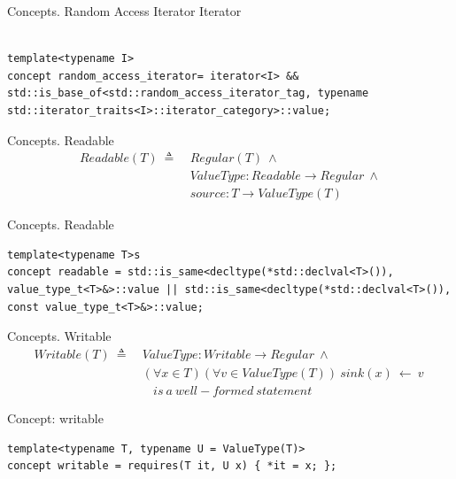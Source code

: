 \documentclass[10pt]{beamer}
\begin{document}
\begin{frame}[fragile]{Concepts. Random Access Iterator Iterator}
\begin{lstlisting}[style=cpp]

template<typename I>
concept random_access_iterator= iterator<I> && std::is_base_of<std::random_access_iterator_tag, typename std::iterator_traits<I>::iterator_category>::value;

\end{lstlisting}
\end{frame}

\begin{frame}{Concepts. Readable}
    \begin{align*}
        Readable(T) ~\triangleq~ & Regular(T) ~\land \\
        & ValueType: Readable \rightarrow Regular ~\land \\
        & source: T \rightarrow ValueType(T)
    \end{align*}
\end{frame}

\begin{frame}[fragile]{Concepts. Readable}
\begin{lstlisting}[style=cpp]
template<typename T>s
concept readable = std::is_same<decltype(*std::declval<T>()), value_type_t<T>&>::value || std::is_same<decltype(*std::declval<T>()), const value_type_t<T>&>::value;
\end{lstlisting}
\end{frame}

\begin{frame}{Concepts. Writable}
    \begin{align*}
        Writable(T) ~\triangleq~ & ValueType: Writable \rightarrow Regular ~\land \\
        & (\forall x \in T) (\forall v \in ValueType(T))~sink(x)~\leftarrow~v ~ \\
        & ~~~~is~a~well-formed~statement
    \end{align*}
\end{frame}

\begin{frame}[fragile]{Concept: writable}
\begin{lstlisting}[style=cpp]
template<typename T, typename U = ValueType(T)>
concept writable = requires(T it, U x) { *it = x; }; 
\end{lstlisting}
\end{frame}
\end{document}
